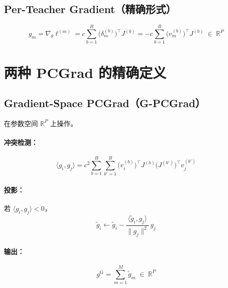 \documentclass[11pt,a4paper]{article}
\newcommand{\R}{\mathbb{R}}
\theoremstyle{definition}
\begin{document}
\subsection{Per-Teacher Gradient（精确形式）}

\begin{equation}
\boxed{
g_m = \nabla_\theta \ell^{(m)} = c \sum_{b=1}^B \bigl(\delta_m^{(b)}\bigr)^\top J^{(b)}
= -c \sum_{b=1}^B \bigl(v_m^{(b)}\bigr)^\top J^{(b)} \;\in\; \R^P
}
\label{eq:per_teacher_grad}
\end{equation}

\section{两种 PCGrad 的精确定义}

\subsection{Gradient-Space PCGrad（G-PCGrad）}

在参数空间 $\R^P$ 上操作。

\paragraph{冲突检测：}
\begin{equation}
\langle g_i, g_j \rangle = c^2 \sum_{b=1}^B \sum_{b'=1}^B \bigl(v_i^{(b)}\bigr)^\top J^{(b)} \bigl(J^{(b')}\bigr)^\top v_j^{(b')}
\label{eq:gpcgrad_dot}
\end{equation}

\paragraph{投影：} 若 $\langle g_i, g_j\rangle < 0$，
\begin{equation}
\tilde{g}_i \leftarrow \tilde{g}_i - \frac{\langle \tilde{g}_i, g_j\rangle}{\|g_j\|^2}\,g_j
\label{eq:gpcgrad_proj}
\end{equation}

\paragraph{输出：}
\begin{equation}
g^{\mathrm{G}} = \sum_{m=1}^M \tilde{g}_m \;\in\; \R^P
\label{eq:gpcgrad_output}
\end{equation}
\end{document}
